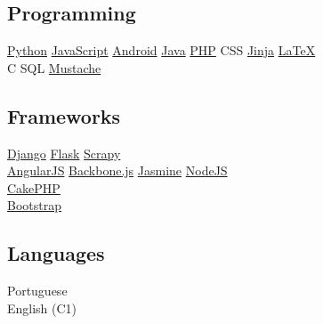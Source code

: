 \documentclass[]{joaosoares-resume}
\begin{document}
\begin{minipage}[t]{0.35\textwidth}
\subsection{Programming}
\href{http://www.python.org}{Python} \textbullet{}
\href{http://www.php.net}{JavaScript} \textbullet{}
\href{http://android.com}{Android} \textbullet{}
\href{https://www.oracle.com/java/}{Java} \textbullet{}
\href{http://www.php.net}{PHP} \textbullet{}
CSS \textbullet{}
\href{http://jinja.pocoo.org/}{Jinja} \textbullet{}
\href{http://www.latex-project.org}{\LaTeX} \\
C \textbullet{}
SQL \textbullet{}
\href{https://mustache.github.io/}{Mustache}\\
\sectionsep

\subsection{Frameworks}
\href{https://www.djangoproject.com/}{Django} \textbullet{}
\href{http://flask.pocoo.org/}{Flask} \textbullet{}
\href{https://scrapy.org/}{Scrapy} \\
\href{https://angularjs.org/}{AngularJS} \textbullet{}
\href{http://backbonejs.org/}{Backbone.js} \textbullet{}
\href{https://jasmine.github.io/}{Jasmine} \textbullet{}
\href{https://nodejs.org/en/}{NodeJS} \\
\href{https://cakephp.org/}{CakePHP} \\
\href{http://getbootstrap.com/}{Bootstrap} \\
\sectionsep

\subsection{Languages}
Portuguese \\
English (C1) \\


\end{minipage} 
\hfill
\end{document}
